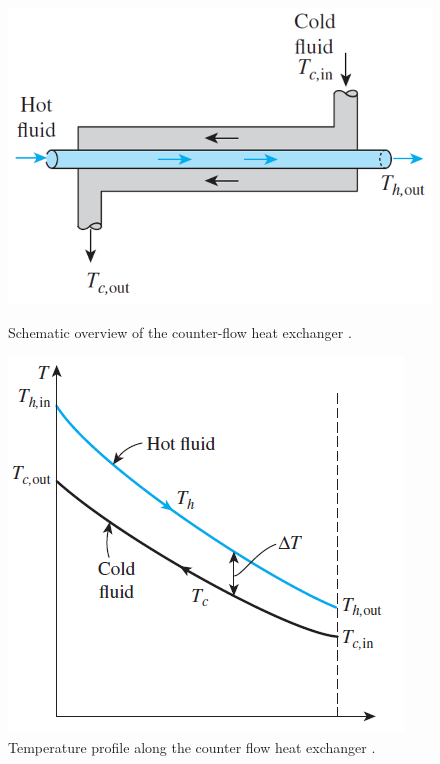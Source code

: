 \begin{figure}[htbp]
  \centering
  \begin{minipage}[b]{0.4\textwidth}
    \centering
    \includegraphics[width=\textwidth]{Literature Survey - DCSC template/figuresLIT/countercurrent.png}
    \caption{Schematic overview of the counter-flow heat exchanger \cite{cengel2025heat}.}
    \label{fig::counterhex}
  \end{minipage}
  \begin{minipage}[b]{0.4\textwidth}
    \centering
    \includegraphics[width=\textwidth]{Literature Survey - DCSC template/figuresLIT/heatexchangerTemperatureprofile.png}
    \caption{Temperature profile along the counter flow heat exchanger \cite{cengel2025heat}.}
    \label{fig::counterflowHEX}
  \end{minipage}
\end{figure}


